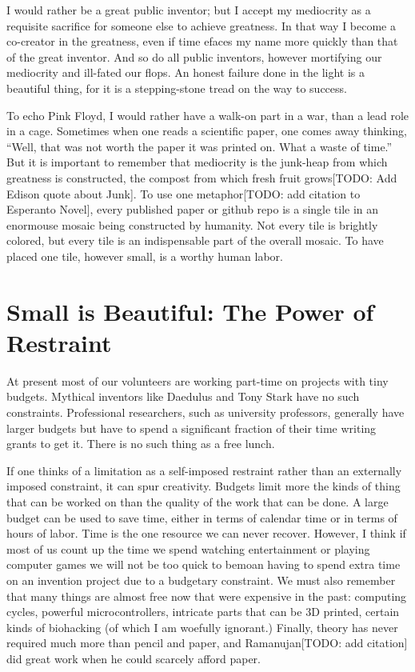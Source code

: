 \documentclass[
	fontsize=10pt, %
	twoside=false, %
	secnumdepth=1, %
]{kaobook}
\begin{document}
I would rather be a great public inventor; but I accept my mediocrity
as a requisite sacrifice for someone else to achieve
greatness. In that way I become a co-creator in
the greatness, even if time efaces my
name more quickly than that of the great inventor.
And so do all public inventors, however mortifying our
mediocrity and ill-fated our flops.
An honest failure done in the light is a beautiful thing,
for it is a stepping-stone tread on the way to success.

To echo Pink Floyd, I would rather have a walk-on part in a war,
than a lead role in a cage.
Sometimes when one reads a scientific paper, one comes away thinking, ``Well, that was not worth the paper it was printed on.
What a waste of time.'' But it is important to remember that mediocrity
is the junk-heap from which greatness is constructed, the compost from which fresh fruit grows[TODO: Add Edison quote about Junk].
To use one metaphor[TODO: add citation to Esperanto Novel], every published paper or github repo is a single tile
in an enormouse mosaic being constructed by humanity. Not every tile is brightly colored, but every tile is
an indispensable part of the overall mosaic.
To have placed one tile, however small, is a worthy human labor.

\section{Small is Beautiful: The Power of Restraint}

At present most of our volunteers are working part-time on projects
with tiny budgets.
Mythical inventors like Daedulus and Tony Stark have no such constraints.
Professional researchers, such as university professors, generally have larger budgets
but have to spend a significant fraction of their time writing grants to get it.
There is no such thing as a free lunch.

If one thinks of a limitation as a self-imposed restraint rather than
an externally imposed constraint, it can spur creativity.  Budgets
limit more the kinds of thing that can be worked on than the quality
of the work that can be done.  A large budget can be used to save
time, either in terms of calendar time or in terms of hours of labor.
Time is the one resource we can never recover.  However, I think if
most of us count up the time we spend watching entertainment or
playing computer games we will not be too quick to bemoan having to
spend extra time on an invention project due to a budgetary
constraint.  We must also remember that many things are almost free
now that were expensive in the past: computing cycles, powerful
microcontrollers, intricate parts that can be 3D printed, certain
kinds of biohacking (of which I am woefully ignorant.)  Finally,
theory has never required much more than pencil and paper, and
Ramanujan[TODO: add citation] did great work when he could scarcely
afford paper.
\end{document}
